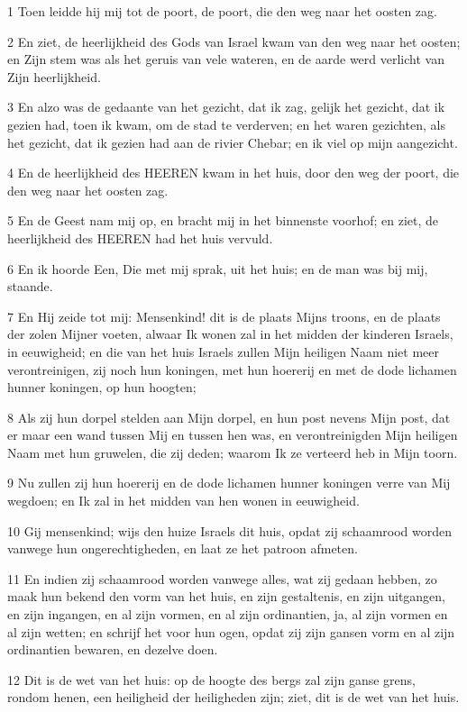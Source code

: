 \par 1 Toen leidde hij mij tot de poort, de poort, die den weg naar het oosten zag.
\par 2 En ziet, de heerlijkheid des Gods van Israel kwam van den weg naar het oosten; en Zijn stem was als het geruis van vele wateren, en de aarde werd verlicht van Zijn heerlijkheid.
\par 3 En alzo was de gedaante van het gezicht, dat ik zag, gelijk het gezicht, dat ik gezien had, toen ik kwam, om de stad te verderven; en het waren gezichten, als het gezicht, dat ik gezien had aan de rivier Chebar; en ik viel op mijn aangezicht.
\par 4 En de heerlijkheid des HEEREN kwam in het huis, door den weg der poort, die den weg naar het oosten zag.
\par 5 En de Geest nam mij op, en bracht mij in het binnenste voorhof; en ziet, de heerlijkheid des HEEREN had het huis vervuld.
\par 6 En ik hoorde Een, Die met mij sprak, uit het huis; en de man was bij mij, staande.
\par 7 En Hij zeide tot mij: Mensenkind! dit is de plaats Mijns troons, en de plaats der zolen Mijner voeten, alwaar Ik wonen zal in het midden der kinderen Israels, in eeuwigheid; en die van het huis Israels zullen Mijn heiligen Naam niet meer verontreinigen, zij noch hun koningen, met hun hoererij en met de dode lichamen hunner koningen, op hun hoogten;
\par 8 Als zij hun dorpel stelden aan Mijn dorpel, en hun post nevens Mijn post, dat er maar een wand tussen Mij en tussen hen was, en verontreinigden Mijn heiligen Naam met hun gruwelen, die zij deden; waarom Ik ze verteerd heb in Mijn toorn.
\par 9 Nu zullen zij hun hoererij en de dode lichamen hunner koningen verre van Mij wegdoen; en Ik zal in het midden van hen wonen in eeuwigheid.
\par 10 Gij mensenkind; wijs den huize Israels dit huis, opdat zij schaamrood worden vanwege hun ongerechtigheden, en laat ze het patroon afmeten.
\par 11 En indien zij schaamrood worden vanwege alles, wat zij gedaan hebben, zo maak hun bekend den vorm van het huis, en zijn gestaltenis, en zijn uitgangen, en zijn ingangen, en al zijn vormen, en al zijn ordinantien, ja, al zijn vormen en al zijn wetten; en schrijf het voor hun ogen, opdat zij zijn gansen vorm en al zijn ordinantien bewaren, en dezelve doen.
\par 12 Dit is de wet van het huis: op de hoogte des bergs zal zijn ganse grens, rondom henen, een heiligheid der heiligheden zijn; ziet, dit is de wet van het huis.
